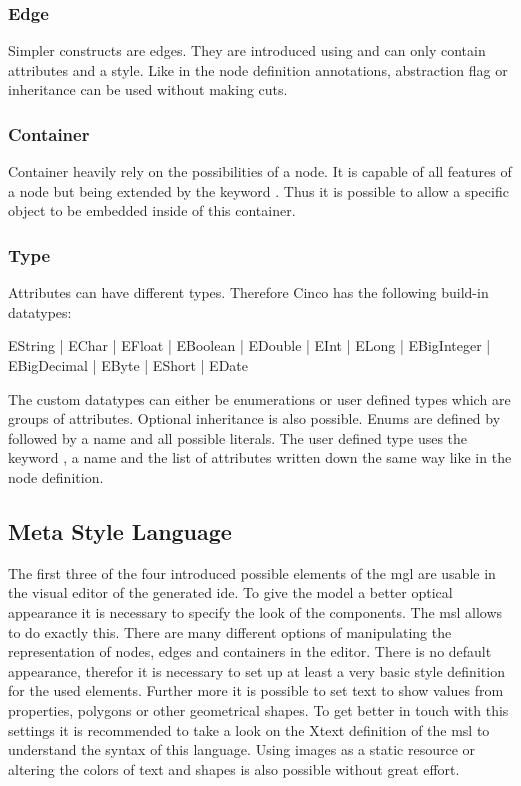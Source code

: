 \subsubsection{Edge}

Simpler constructs are edges. They are introduced using  and can only contain attributes and a style. Like in the node definition annotations, abstraction flag or inheritance can be used without making cuts.

\subsubsection{Container}

Container heavily rely on the possibilities of a node. It is capable of all features of a node but being extended by the keyword . Thus it is possible to allow a specific object to be embedded inside of this container.

\subsubsection{Type}

Attributes can have different types. Therefore Cinco has the following build-in datatypes:

\begin{center}
	EString | EChar | EFloat | EBoolean | EDouble | EInt | ELong | EBigInteger | EBigDecimal | EByte | EShort | EDate
\end{center}


The custom datatypes can either be enumerations or user defined types which are groups of attributes. Optional inheritance is also possible. Enums are defined by  followed by a name and all possible literals. The user defined type uses the keyword , a name and the list of attributes written down the same way like in the node definition.

\subsection{Meta Style Language}

The first three of the four introduced possible elements of the \gls{mgl} are usable in the visual editor of the generated \gls{ide}. To give the model a better optical appearance it is necessary to specify the look of the components. The \gls{msl} allows to do exactly this. There are many different options of manipulating the representation of nodes, edges and containers in the editor. There is no default appearance, therefor it is necessary to set up at least a very basic style definition for the used elements. Further more it is possible to set text to show values from properties, polygons or other geometrical shapes. To get better in touch with this settings it is recommended to take a look on the Xtext definition of the \gls{msl} to understand the syntax of this language. Using images as a static resource or altering the colors of text and shapes is also possible without great effort.